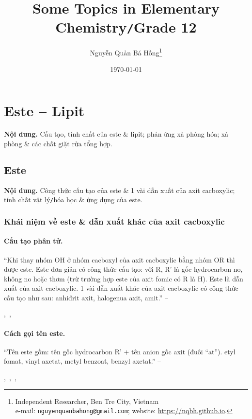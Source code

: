 \documentclass{article}
\title{Some Topics in Elementary Chemistry\texttt{/}Grade 12}
\author{Nguyễn Quản Bá Hồng\footnote{Independent Researcher, Ben Tre City, Vietnam\\e-mail: \texttt{nguyenquanbahong@gmail.com}; website: \url{https://nqbh.github.io}.}}
\date{\today}
\numberwithin{equation}{section}
\begin{document}
\maketitle
\begin{abstract}
	
\end{abstract}
\setcounter{secnumdepth}{4}
\setcounter{tocdepth}{3}
\tableofcontents
\newpage


\section{Este -- Lipit}
\textsf{\textbf{Nội dung.} Cấu tạo, tính chất của este \& lipit; phản ứng xà phòng hóa; xà phòng \& các chất giặt rửa tổng hợp.}

\subsection{Este}
\textsf{\textbf{Nội dung.} Công thức cấu tạo của este \& 1 vài dẫn xuất của axit cacboxylic; tính chất vật lý\texttt{/}hóa học \& ứng dụng của este.}

\subsubsection{Khái niệm về este \& dẫn xuất khác của axit cacboxylic}

\paragraph{Cấu tạo phân tử.} ``Khi thay nhóm OH ở nhóm cacboxyl của axit cacboxylic bằng nhóm OR thì được este. Este đơn giản có công thức cấu tạo:  với R, R' là gốc hydrocarbon no, không no hoặc thơm (trừ trường hợp este của axit fomic có R là H). Este là dẫn xuất của axit cacboxylic. 1 vài dẫn xuất khác của axit cacboxylic có công thức cấu tạo như sau: anhiđrit axit, halogenua axit, amit.'' -- \cite[p. 4]{SGK_Hoa_Hoc_12_nang_cao}
\begin{center}
	,\ ,\ 
\end{center}

\paragraph{Cách gọi tên este.} ``Tên este gồm: tên gốc hydrocarbon R' $+$ tên anion gốc axit (đuôi ``at''). etyl fomat, vinyl axetat, metyl benzoat, benzyl axetat.'' -- \cite[p. 4]{SGK_Hoa_Hoc_12_nang_cao}
\begin{center}
	,\ ,\ ,\ 
\end{center}
\end{document}
